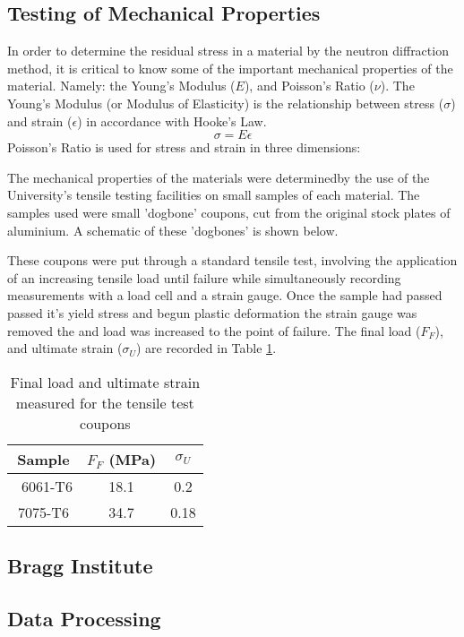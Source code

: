 \documentclass[11pt, oneside]{article}   	%
\begin{document}
\subsection{Testing of Mechanical Properties}
In order to determine the residual stress in a material by the neutron diffraction method, it is critical to know some of the important mechanical properties of the material. Namely: the Young's Modulus ($E$), and Poisson's Ratio ($\nu$). The Young's Modulus (or Modulus of Elasticity) is the relationship between stress ($\sigma$) and strain ($\epsilon$) in accordance with Hooke's Law.
$$\sigma = E\epsilon$$
Poisson's Ratio is used for stress and strain in three dimensions:

The mechanical properties of the materials were determinedby the use of the University's tensile testing facilities on small samples of each material. The samples used were small 'dogbone' coupons, cut from the original stock plates of aluminium. A schematic of these 'dogbones' is shown below.

These coupons were put through a standard tensile test, involving the application of an increasing tensile load until failure while simultaneously recording measurements with a load cell and a strain gauge. Once the sample had passed passed it's yield stress and begun plastic deformation the strain gauge was removed the and load was increased to the point of failure. The final load ($F_F$), and ultimate strain ($\sigma_U$) are recorded in Table \ref{tab:a}.
\begin{table}[h]
	\centering
	\caption{Final load and ultimate strain measured for the tensile test coupons}\label{tab:a}
	\begin{tabular}[c]{c | c c}
	Sample & $F_F$ (\si{\mega\pascal}) & $\sigma_U$ \\ \hline\
	6061-T6 & 18.1 & 0.2 \\
	7075-T6 & 34.7 & 0.18 \\
	\end{tabular}
\end{table}
\subsection{Bragg Institute}
\subsection{Data Processing}
\end{document}
